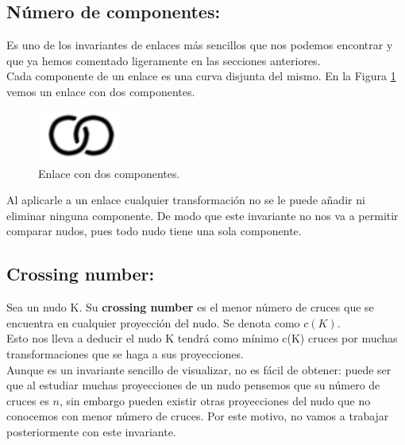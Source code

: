 \begin{center}
	\subsection{Número de componentes:}
\end{center}
Es uno de los invariantes de enlaces más sencillos que nos podemos encontrar y que ya hemos comentado ligeramente en las secciones anteriores.\\

Cada componente de un enlace es una curva disjunta del mismo. En la Figura \ref{inv1} vemos un enlace con dos componentes. 
\begin{figure}[h!]
	\includegraphics[width=2.7cm]{inudos/enlace.png}
	\centering
	\caption{Enlace con dos componentes.}
	\label{inv1} 
\end{figure}

Al aplicarle a un enlace cualquier transformación no se le puede añadir ni eliminar ninguna componente. De modo que este invariante no nos va a permitir comparar nudos, pues todo nudo tiene una sola componente. \\

\bigskip
\begin{center}
	\subsection{Crossing number:}
\end{center}
Sea un nudo K. Su \textbf{crossing number} es el menor número de cruces que se encuentra en cualquier proyección del nudo. Se denota como $c(K)$. \\

Esto nos lleva a deducir el nudo K tendrá como mínimo c(K) cruces por muchas transformaciones que se haga a sus proyecciones.\\

Aunque es un invariante sencillo de visualizar, no es fácil de obtener: puede ser que al estudiar muchas proyecciones de un nudo pensemos que su número de cruces es $n$, sin embargo pueden existir otras proyecciones del nudo que no conocemos con menor número de cruces. Por este motivo, no vamos a trabajar posteriormente con este invariante.\\

